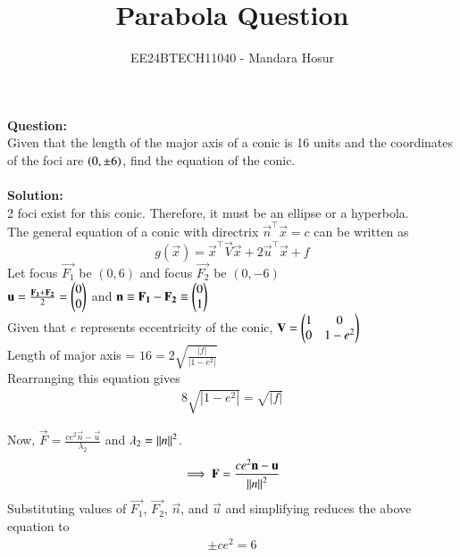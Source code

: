 \documentclass[journal]{IEEEtran}
\begin{document}

\vspace{3cm}

\title{Parabola Question}
\author{EE24BTECH11040 - Mandara Hosur}
{\let\newpage\relax\maketitle}

\renewcommand{\thefigure}{\theenumi}
\renewcommand{\thetable}{\theenumi}
\setlength{\intextsep}{10pt} %


\renewcommand{\thetable}{\theenumi}

\textbf{Question:}\\
Given that the length of the major axis of a conic is 16 units and the coordinates of the foci are $\left(0,\pm6\right)$, find the equation of the conic.
\\ \\
\textbf{Solution:} \\
2 foci exist for this conic. Therefore, it must be an ellipse or a hyperbola.
\\
The general equation of a conic with directrix $\vec{n}^\top\vec{x}=c$ can be written as $$g(\vec{x}) = \vec{x}^\top\vec{V}\vec{x}+2\vec{u}^\top\vec{x}+f$$ 
Let focus $\vec{F_1}$ be $(0,6)$ and focus $\vec{F_2}$ be $(0,-6)$
\\
$\mathbf{u} =\frac{\mathbf{F_1}+\mathbf{F_2}}{2}=\begin{pmatrix}0\\0\end{pmatrix}$ and $\mathbf{n}\equiv\mathbf{F_1}-\mathbf{F_2}\equiv\begin{pmatrix}0\\1\end{pmatrix}$
\\
Given that $e$ represents eccentricity of the conic, $\mathbf{V} = \begin{pmatrix}1&0\\0&1-e^2\end{pmatrix}$
\\
Length of major axis = $16 = 2\sqrt{\frac{|f|}{|1-e^2|}}$
\\
Rearranging this equation gives 
\begin{align}
8\sqrt{|1-e^2|}=\sqrt{|f|}
\end{align}

Now, $\vec{F}=\frac{ce^2\vec{n}-\vec{u}}{\lambda_2}$ and $\lambda_2=\left\lVert n\right\rVert^2$.
\\
$$\implies\mathbf{F}=\frac{ce^2\mathbf{n}-\mathbf{u}}{\left\lVert n\right\rVert^2}$$
Substituting values of $\vec{F_1}$, $\vec{F_2}$, $\vec{n}$, and $\vec{u}$ and simplifying reduces the above equation to
\begin{align}
\pm ce^2=6
\end{align}
\end{document}
